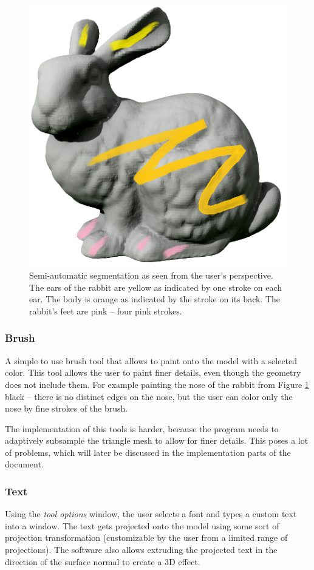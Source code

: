 \begin{figure}
	\centering
	\includegraphics[scale=0.75]{images/rabbit.png}
	\caption{Semi-automatic segmentation as seen from the user's perspective. The ears of the rabbit are yellow as indicated by one stroke on each ear. The body is orange as indicated by the stroke on its back. The rabbit's feet are pink -- four pink strokes.}
	\label{fig:rabbit}
\end{figure}

\subsubsection{Brush}
A simple to use brush tool that allows to paint onto the model with a selected color. This tool allows the user to paint finer details, even though the geometry does not include them. For example painting the nose of the rabbit from Figure \ref{fig:rabbit} black -- there is no distinct edges on the nose, but the user can color only the nose by fine strokes of the brush.

The implementation of this tools is harder, because the program needs to adaptively subsample the triangle mesh to allow for finer details. This poses a lot of problems, which will later be discussed in the implementation parts of the document.

\subsubsection{Text}
Using the \textit{tool options} window, the user selects a font and types a custom text into a window. The text gets projected onto the model using some sort of projection transformation (customizable by the user from a limited range of projections). The software also allows extruding the projected text in the direction of the surface normal to create a $3$D effect.

